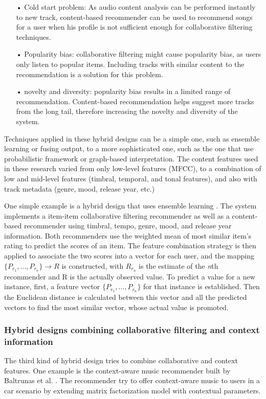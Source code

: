 \begin{itemize}
\item[•] Cold start problem: As audio content analysis can be performed instantly to new track, content-based recommender can be used to recommend songs for a user when his profile is not sufficient enough for collaborative filtering techniques. 

\item[•] Popularity bias: collaborative filtering might cause popularity bias, as users only listen to popular items. Including tracks with similar content to the recommendation is a solution for this problem.

\item[•] novelty and diversity: popularity bias results in a limited range of recommendation. Content-based recommendation helps suggest more tracks from the long tail, therefore increasing the novelty and diversity of the system.
\end{itemize}

Techniques applied in these hybrid designs can be a simple one, such as ensemble learning or fusing output, to a more sophisticated one, such as the one that use probabilistic framework or graph-based interpretation. The content features used in these research varied from only low-level features (MFCC), to a combination of low and mid-level features (timbral, temporal, and tonal features), and also with track metadata (genre, mood, release year, etc.)

One simple example is a hybrid design that uses ensemble learning \cite{tiemann2007towards}. The system implements a item-item collaborative filtering recommender as well as a content-based recommender using timbral, tempo, genre, mood, and release year information. Both recommenders use the weighted mean of most similar item's rating to predict the scores of an item. The feature combination strategy is then applied to associate the two scores into a vector for each user, and the mapping \(\{P_{r_1},\dots,P_{r_n}\} \rightarrow R \) is constructed, with \( R_{r_n} \) is the estimate of the \textit{n}th recommender and R is the actually observed value. To predict a value for a new instance, first, a feature vector \( \{P_{r_1},\dots,P_{r_n}\} \) for that instance is established. Then the Euclidean distance is calculated between this vector and all the predicted vectors to find the most similar vector, whose actual value is promoted. 

\subsubsection{Hybrid designs combining collaborative filtering and context information}
The third kind of hybrid design tries to combine collaborative and context features. One example is the context-aware music recommender built by Baltrunas et al. \cite{baltrunas2011incarmusic}. The recommender try to offer context-aware music to users in a car scenario by extending matrix factorization model with contextual parameters.

